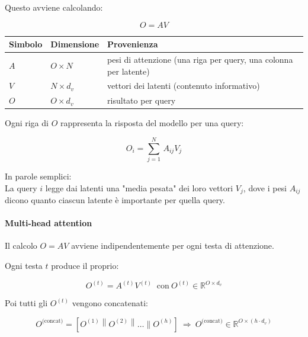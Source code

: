 \documentclass[
  11pt,
]{article}
\newcounter{none} %
\begin{document}
Questo avviene calcolando:

\[O = AV\]

{\def\LTcaptype{none} %
\begin{longtable}{@{}
  >{\raggedright\arraybackslash}p{}
  >{\raggedright\arraybackslash}p{}
  >{\raggedright\arraybackslash}p{}@{}}
\toprule\noalign{}
\begin{minipage}[b]{\linewidth}\raggedright
Simbolo
\end{minipage} & \begin{minipage}[b]{\linewidth}\raggedright
Dimensione
\end{minipage} & \begin{minipage}[b]{\linewidth}\raggedright
Provenienza
\end{minipage} \\
\midrule\noalign{}
\endhead
\bottomrule\noalign{}
\endlastfoot
\(A\) & \(O \times N\) & pesi di attenzione (una riga per query, una
colonna per latente) \\
\(V\) & \(N \times d_{v}\) & vettori dei latenti (contenuto
informativo) \\
\(O\) & \(O \times d_{v}\) & risultato per query \\
\end{longtable}
}

Ogni riga di \(O\) rappresenta la risposta del modello per una query:

\[O_{i} = \sum_{j = 1}^{N}\, A_{ij}V_{j}\]

In parole semplici:\\
La query \(i\) legge dai latenti una "media pesata" dei loro vettori
\(V_{j}\), dove i pesi \(A_{ij}\) dicono quanto ciascun latente è
importante per quella query.

\paragraph{Multi-head attention}

Il calcolo \(O = AV\) avviene indipendentemente per ogni testa di
attenzione.

Ogni testa \(t\) produce il proprio:

\[O^{(t)} = A^{(t)}V^{(t)}\ \text{ con}\ O^{(t)} \in \mathbb{R}^{O \times d_{v}}\]

Poi tutti gli \(O^{(t)}\) vengono concatenati:

\[O^{\text{(concat)}} = \left\lbrack O^{(1)}\left\| O^{(2)} \right\|\ldots\| O^{(h)} \right\rbrack\  \Rightarrow \ O^{\text{(concat)}} \in \mathbb{R}^{O \times \left( h \cdot d_{v} \right)}\]
\end{document}
